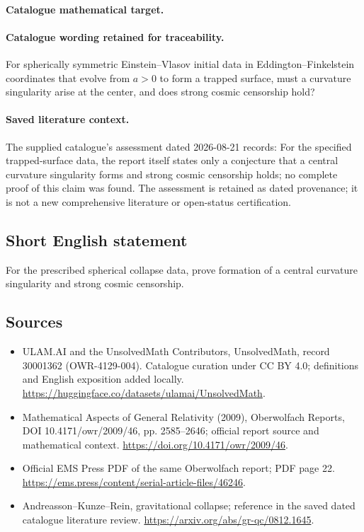 \documentclass[11pt]{article}
\begin{document}
\paragraph{Catalogue mathematical target.}
\paragraph{Catalogue wording retained for traceability.}
For spherically symmetric Einstein–Vlasov initial data in Eddington–Finkelstein coordinates that evolve from $a>0$ to form a trapped surface, must a curvature singularity arise at the center, and does strong cosmic censorship hold?

\paragraph{Saved literature context.} The supplied catalogue's assessment dated 2026-08-21 records: For the specified trapped-surface data, the report itself states only a conjecture that a central curvature singularity forms and strong cosmic censorship holds; no complete proof of this claim was found. The assessment is retained as dated provenance; it is not a new comprehensive literature or open-status certification.
\subsection{Short English statement}
For the prescribed spherical collapse data, prove formation of a central curvature singularity and strong cosmic censorship.
\subsection{Sources}
\begin{itemize}
\item[\hypertarget{source:30001362:1}{S1}] ULAM.AI and the UnsolvedMath Contributors, UnsolvedMath, record 30001362 (OWR-4129-004). Catalogue curation under CC BY 4.0; definitions and English exposition added locally.
\url{https://huggingface.co/datasets/ulamai/UnsolvedMath}.
\item[\hypertarget{source:30001362:2}{S2}] Mathematical Aspects of General Relativity (2009), Oberwolfach Reports, DOI 10.4171/owr/2009/46, pp. 2585--2646; official report source and mathematical context.
\url{https://doi.org/10.4171/owr/2009/46}.
\item[\hypertarget{source:30001362:3}{S3}] Official EMS Press PDF of the same Oberwolfach report; PDF page 22.
\url{https://ems.press/content/serial-article-files/46246}.
\item[\hypertarget{source:30001362:4}{S4}] Andreasson--Kunze--Rein, gravitational collapse; reference in the saved dated catalogue literature review.
\url{https://arxiv.org/abs/gr-qc/0812.1645}.
\end{itemize}
\label{end:30001362}
\end{document}
